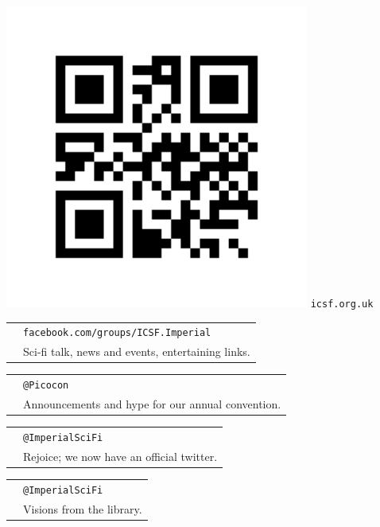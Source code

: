 \newcommand{\socialmedia}[3]{
  \begin{tabular}{r l}
    \multirow{2}{*}{\LARGE {#1}}
    & \texttt{#2} \\[-0.5em]
    & {\footnotesize #3}
  \end{tabular}
}
\begin{minipage}[t]{0.33\textwidth}
  \vspace{-1.3em}
  \begin{center}
  \includegraphics[width=0.75\textwidth]{img/qr-small.png}
  \texttt{icsf.org.uk}
  \end{center}
\end{minipage}
\begin{minipage}[t]{0.4\textwidth}
  \vspace{0em}
  \socialmedia{\faFacebookOfficial}{facebook.com/groups/ICSF.Imperial}{
    Sci-fi talk, news and events, entertaining links.}
  \socialmedia{\faTwitter}{@Picocon}{
    Announcements and hype for our annual convention.}
  \socialmedia{\faTwitter}{@Imperial\textunderscore SciFi}{
    Rejoice; we now have an official twitter.}
  \socialmedia{\faInstagram}{@Imperial\textunderscore SciFi}{
    Visions from the library.}
\end{minipage}
